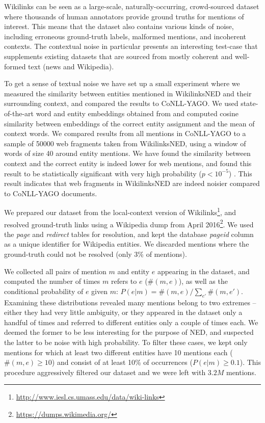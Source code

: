 \documentclass[11pt]{article}
\begin{document}
	Wikilinks can be seen as a large-scale, naturally-occurring, crowd-sourced dataset where thousands of human annotators provide ground truths for mentions of interest. This means that the dataset also contains various kinds of noise, including erroneous ground-truth labels, malformed mentions, and incoherent contexts. The contextual noise in particular presents an interesting test-case that supplements existing datasets that are sourced from mostly coherent and well-formed text (news and Wikipedia). 
	
	To get a sense of textual noise we have set up a small experiment where we measured the similarity between entities mentioned in WikilinksNED and their surrounding context, and compared the results to CoNLL-YAGO. We used state-of-the-art word and entity embeddings obtained from  and computed cosine similarity between embeddings of the correct entity assignment and the mean of context words. We compared results from all mentions in CoNLL-YAGO to a sample of 50000 web fragments taken from WikilinksNED, using a window of words of size 40 around entity mentions. We have found the similarity between context and the correct entity is indeed lower for web mentions, and found this result to be statistically significant with very high probability ($p<10^{-5}$) . This result indicates that web fragments in WikilinksNED are indeed noisier compared to CoNLL-YAGO documents.
	
	We prepared our dataset from the local-context version of Wikilinks\footnote{\url{http://www.iesl.cs.umass.edu/data/wiki-links}}, and resolved ground-truth links using a Wikipedia dump from April 2016\footnote{\url{https://dumps.wikimedia.org/}}. We used the \emph{page} and \emph{redirect} tables for resolution, and kept the database \emph{pageid} column as a unique identifier for Wikipedia entities. We discarded mentions where the ground-truth could not be resolved (only 3\% of mentions).
	
	We collected all pairs of mention $m$ and entity $e$ appearing in the dataset, and computed the number of times $m$ refers to $e$ ($\#(m,e)$), as well as the conditional probability of $e$ given $m$: $P(e|m)=\#(m,e)/\sum_{e'}\#(m,e')$. Examining these distributions revealed many mentions belong to two extremes -- either they had very little ambiguity, or they appeared in the dataset only a handful of times and referred to different entities only a couple of times each. We deemed the former to be less interesting for the purpose of NED, and suspected the latter to be noise with high probability. To filter these cases, we kept only mentions for which at least two different entities have 10 mentions each ($\#(m,e) \ge 10$) and consist of at least 10\% of occurrences ($P(e|m) \ge 0.1$). This procedure aggressively filtered our dataset and we were left with $3.2M$ mentions.
	
\end{document}
